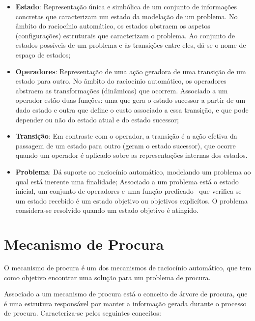 \begin{itemize}
    \item \textbf{Estado}: Representação única e simbólica de um conjunto de informações concretas que caracterizam um estado da modelação de um problema. No âmbito do raciocínio automático, os estados abstraem os aspetos (configurações) estruturais que caracterizam o problema. Ao conjunto de estados possíveis de um problema e às transições entre eles, dá-se o nome de espaço de estados;
    \item \textbf{Operadores}: Representação de uma ação geradora de uma transição de um estado para outro.
    No âmbito do raciocínio automático, os operadores abstraem as transformações (dinâmicas) que ocorrem.
    Associado a um operador estão duas funções: uma que gera o estado sucessor a partir de um dado estado e outra que define o custo associado a essa transição, e que pode depender ou não do estado atual e do estado sucessor;
    \item \textbf{Transição}: Em contraste com o operador, a transição é a ação efetiva da passagem de um estado para outro (geram o estado sucessor), que ocorre quando um operador é aplicado sobre as representações internas dos estados.
    \item \textbf{Problema}: Dá suporte ao raciocínio automático, modelando um problema ao qual está inerente uma finalidade;
    Associado a um problema está o estado inicial, um conjunto de operadores e uma função predicado~\cite{stanford:fp:function-predicates} que verifica se um estado recebido é um estado objetivo ou objetivos explicítos.
    O problema considera-se resolvido quando um estado objetivo é atingido.
\end{itemize}


\section{Mecanismo de Procura}\label{sec:mecanismo-procura}

O mecanismo de procura é um dos mecanismos de raciocínio automático, que tem como objetivo encontrar uma solução para um problema de procura.

Associado a um mecanismo de procura está o conceito de árvore de procura, que é uma estrutura responsável por manter a informação gerada durante o processo de procura.
Caracteriza-se pelos seguintes conceitos:

